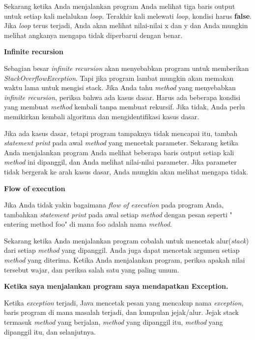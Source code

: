 \documentclass[12pt,b5paper,openright,twoside]{book}
\begin{document}
\noindent Sekarang ketika Anda menjalankan program Anda melihat tiga baris output untuk setiap kali melalukan \textit{loop}. Terakhir kali melewati \textit{loop}, kondisi harus \textbf{false}. Jika \textit{loop} terus terjadi, Anda akan melihat nilai-nilai x dan y dan Anda mungkin melihat angkanya mengapa tidak diperbarui dengan benar.

\noindent \textbf{Infinite recursion}

\noindent Sebagian besar \textit{infinite recursion} akan menyebabkan program untuk memberikan \textit{StackOverflowException}. Tapi jika program lambat mungkin akan memakan waktu lama untuk mengisi stack.
Jika Anda tahu \textit{method} yang menyebabkan \textit{infinite recursion}, periksa bahwa ada kasus dasar. Harus ada beberapa kondisi yang membuat \textit{method} kembali tanpa membuat rekursif. Jika tidak, Anda perlu memikirkan kembali algoritma dan mengidentifikasi kasus dasar.

\noindent Jika ada kasus dasar, tetapi program tampaknya tidak mencapai itu, tambah \textit{statement print} pada awal \textit{method} yang mencetak parameter. Sekarang ketika Anda menjalankan program Anda melihat beberapa baris output setiap kali \textit{method} ini dipanggil, dan Anda melihat nilai-nilai parameter. Jika parameter tidak bergerak ke arah kasus dasar, Anda mungkin akan melihat mengapa tidak.

\noindent \textbf{Flow of execution}

\noindent Jika Anda tidak yakin bagaimana \textit{flow of execution} pada program Anda, tambahkan \textit{statement print} pada awal setiap \textit{method} dengan pesan seperti " entering method foo" di mana foo adalah nama \textit{method}.

\noindent Sekarang ketika Anda menjalankan program cobalah untuk mencetak alur(\textit{stack}) dari setiap \textit{method} yang dipanggil. Anda juga dapat mencetak argumen setiap \textit{method} yang diterima. Ketika Anda menjalankan program, periksa apakah nilai tersebut wajar, dan periksa salah satu yang paling umum.

\noindent \textbf{Ketika saya menjalankan program saya mendapatkan Exception.}

\noindent Ketika \textit{exception} terjadi, Java mencetak pesan yang mencakup nama \textit{exception}, baris program di mana masalah terjadi, dan kumpulan jejak/alur. Jejak stack termasuk \textit{method} yang berjalan, \textit{method} yang dipanggil itu, \textit{method} yang dipanggil itu, dan selanjutnya.
\end{document}
